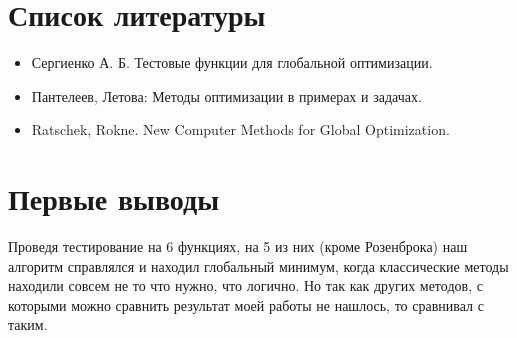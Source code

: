 \section{Список литературы}
    \begin{itemize}
        \item Сергиенко А. Б. Тестовые функции для глобальной оптимизации.
        \item Пантелеев, Летова: Методы оптимизации в примерах и задачах.
        \item Ratschek, Rokne. New Computer Methods for Global Optimization.
    \end{itemize}


    \section{Первые выводы}
    Проведя тестирование на 6 функциях, на 5 из них (кроме Розенброка) наш алгоритм справлялся и находил глобальный минимум, когда классические методы находили совсем не то что нужно, что логично. Но так как других методов, с которыми можно сравнить результат моей работы не нашлось, то сравнивал с таким.